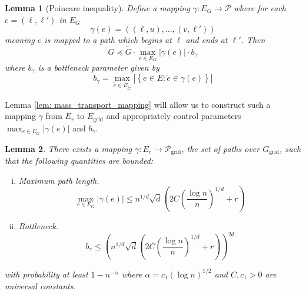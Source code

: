 \documentclass{article}
\newcommand{\abs}[1]{\left \lvert #1 \right \rvert}
\newcommand{\set}[1]{\left\{#1\right\}}
\newcommand{\1}{\mathbb{I}}
\newcommand{\grid}{\mathrm{grid}}
\theoremstyle{alden}
\theoremstyle{aldenthm}
\newtheorem{lemma}{Lemma}
\theoremstyle{definition}
\theoremstyle{remark}
\begin{document}
\begin{lemma}[Poincare inequality]
	\label{lem: poincare}
	Define a mapping $\gamma: E_G \to \mathcal{P}$ where for each $e = (\ell,\ell')$ in $E_G$
	\begin{equation*}
	\gamma(e) = ((\ell,u), \ldots, (v,\ell'))
	\end{equation*}
	meaning $e$ is mapped to a path which begins at $\ell$ and ends at $\ell'$. Then
	\begin{equation*}
	G \preceq \widetilde{G} \cdot \max_{e \in E_G} \abs{\gamma(e)}  \cdot b_{\gamma}
	\end{equation*}
	where $b_{\gamma}$ is a bottleneck parameter given by
	\begin{equation*}
	b_{\gamma} = \max_{\widetilde{e} \in E_{\widetilde{G}}} \abs{\set{e \in E: \widetilde{e} \in \gamma(e)}}
	\end{equation*}
\end{lemma}

Lemma \ref{lem: mass_transport_mapping} will allow us to construct such a mapping $\gamma$ from $E_r$ to $E_{\grid}$ and appropriately control parameters $\max_{e \in E_G} \abs{\gamma(e)}$ and $b_{\gamma}$.

\begin{lemma}
	There exists a mapping $\gamma: E_r \to \mathcal{P}_{\grid}$, the set of paths over $G_{\grid}$, such that the following quantities are bounded:
	\begin{enumerate}[(i)]
		\item \textit{Maximum path length.} 
		\begin{equation*}
		\max_{e \in E_G} \abs{\gamma(e)} \leq n^{1/d} \sqrt{d} \left(2C\left(\frac{\log n}{n}\right)^{1/d} + r \right)
		\end{equation*}
		\item \textit{Bottleneck.}
		\begin{equation*}
		b_{\gamma} \leq \left(n^{1/d} \sqrt{d} \left(2C\left(\frac{\log n}{n}\right)^{1/d} + r \right) \right)^{2d}
		\end{equation*}
	\end{enumerate}
	with probability at least $1 - n^{-\alpha}$ where $\alpha = c_1 (\log n)^{1/2}$ and $C, c_1 > 0$ are universal constants.
\end{lemma}
\end{document}
